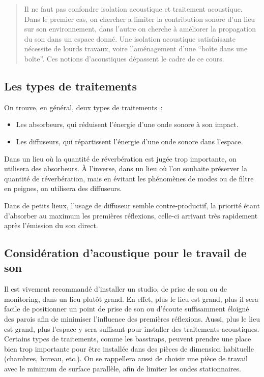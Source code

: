 \documentclass[
]{book}
\providecommand{\tightlist}{%
  \setlength{\itemsep}{0pt}\setlength{\parskip}{0pt}}
\begin{document}
\begin{quote}
Il ne faut pas confondre isolation acoustique et traitement acoustique. Dans le premier cas, on chercher a limiter la contribution sonore d'un lieu sur son environnement, dans l'autre on cherche à améliorer la propagation du son dans un espace donné. Une isolation acoustique satisfaisante nécessite de lourds travaux, voire l'aménagement d'une ``boîte dans une boîte''. Ces notions d'acoustiques dépassent le cadre de ce cours.
\end{quote}

\hypertarget{les-types-de-traitements}{%
\subsection{Les types de traitements}\label{les-types-de-traitements}}

On trouve, en général, deux types de traitements~:

\begin{itemize}
\tightlist
\item
  Les absorbeurs, qui réduisent l'énergie d'une onde sonore à son impact.
\item
  Les diffuseurs, qui répartissent l'énergie d'une onde sonore dans l'espace.
\end{itemize}

Dans un lieu où la quantité de réverbération est jugée trop importante, on utilisera des absorbeurs. À l'inverse, dans un lieu où l'on souhaite préserver la quantité de réverbération, mais en évitant les phénomènes de modes ou de filtre en peignes, on utilisera des diffuseurs.

Dans de petits lieux, l'usage de diffuseur semble contre-productif, la priorité étant d'absorber au maximum les premières réflexions, celle-ci arrivant très rapidement après l'émission du son direct.

\hypertarget{considuxe9ration-dacoustique-pour-le-travail-de-son}{%
\subsection{Considération d'acoustique pour le travail de son}\label{considuxe9ration-dacoustique-pour-le-travail-de-son}}

Il est vivement recommandé d'installer un studio, de prise de son ou de monitoring, dans un lieu plutôt grand. En effet, plus le lieu est grand, plus il sera facile de positionner un point de prise de son ou d'écoute suffisamment éloigné des parois afin de minimiser l'influence des premières réflexions. Aussi, plus le lieu est grand, plus l'espace y sera suffisant pour installer des traitements acoustiques. Certains types de traitements, comme les basstraps, peuvent prendre une place bien trop importante pour être installée dans des pièces de dimension habituelle (chambres, bureau, etc.). On se rappellera aussi de choisir une pièce de travail avec le minimum de surface parallèle, afin de limiter les ondes stationnaires.
\end{document}
